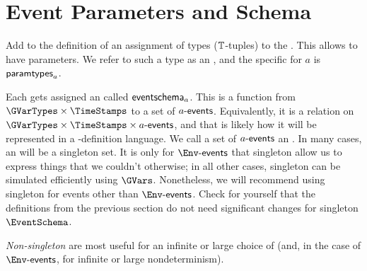 \documentclass[12pt]{article}
\begin{document}
\section{Event Parameters and Schema} \label{eventparams}

Add to the definition of \Contract an assignment of types ($\mathbb{T}$-tuples) to the \Actions. This allows \Events to have parameters. We refer to such a type as an , and the specific \AParamsDomain for \Action $a$ is $\textsf{paramtypes}_{a}$.

Each  gets assigned an  called $\textsf{eventschema}_{a}$. This is a function from $\GVarTypes \times \TimeStamps$ to a set of $a\textsf{-events}$. Equivalently, it is a relation on $\GVarTypes \times \TimeStamps \times \depEvents{a}$, and that is likely how it will be represented in a \Contract-definition language. We call a set of $a\textsf{-events}$ an \EventSchema. In many cases, an \EventSchema will be a singleton set. It is only for $\depEvents{\Env}$ that singleton \EventSchema allow us to express things that we couldn't otherwise; in all other cases, singleton \EventSchema can be simulated efficiently using $\GVars$. Nonetheless, we will recommend using singleton \EventSchema for events other than $\depEvents{\Env}$. Check for yourself that the definitions from the previous section do not need significant changes for singleton $\EventSchema$.

{\it Non-singleton} \EventSchema are most useful for an infinite or large choice of \Actions (and, in the case of $\depEvents{\Env}$, for infinite or large nondeterminism). 






\end{document}
